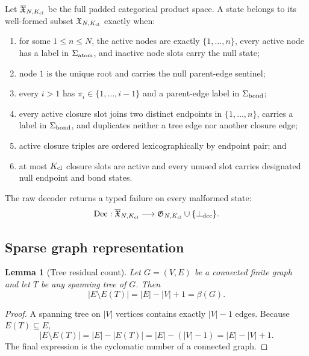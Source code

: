 \documentclass{article}
\newtheorem{lemma}[theorem]{Lemma}
\begin{document}
Let $\overline{\mathfrak X}_{N,K_{\rm cl}}$ be the full padded categorical product space. A state
belongs to its well-formed subset $\mathfrak X_{N,K_{\rm cl}}$ exactly when:
\begin{enumerate}
    \item for some $1\leq n\leq N$, the active nodes are exactly $\{1,\ldots,n\}$, every active
    node has a label in $\Sigma_{\rm atom}$, and inactive node slots carry the null state;
    \item node $1$ is the unique root and carries the null parent-edge sentinel;
    \item every $i>1$ has $\pi_i\in\{1,\ldots,i-1\}$ and a parent-edge label in
    $\Sigma_{\rm bond}$;
    \item every active closure slot joins two distinct endpoints in $\{1,\ldots,n\}$, carries a
    label in $\Sigma_{\rm bond}$, and duplicates neither a tree edge nor another closure edge;
    \item active closure triples are ordered lexicographically by endpoint pair; and
    \item at most $K_{\rm cl}$ closure slots are active and every unused slot carries designated null
    endpoint and bond states.
\end{enumerate}
The raw decoder returns a typed failure on every malformed state:
\begin{equation}
 \operatorname{Dec}:\overline{\mathfrak X}_{N,K_{\rm cl}}
 \longrightarrow\mathfrak G_{N,K_{\rm cl}}\cup\{\bot_{\rm dec}\}.
\end{equation}

\subsection{Sparse graph representation}

\begin{lemma}[Tree residual count]
\label{lem:tree-closure}
Let $G=(V,E)$ be a connected finite graph and let $T$ be any spanning tree of $G$.
Then
\begin{equation}
    |E\setminus E(T)|
    =
    |E|-|V|+1
    =
    \beta(G).
\end{equation}
\end{lemma}

\begin{proof}
A spanning tree on $|V|$ vertices contains exactly $|V|-1$ edges.
Because $E(T)\subseteq E$,
\begin{equation}
    |E\setminus E(T)|
    =
    |E|-|E(T)|
    =
    |E|-(|V|-1)
    =
    |E|-|V|+1.
\end{equation}
The final expression is the cyclomatic number of a connected graph.
\end{proof}
\end{document}
